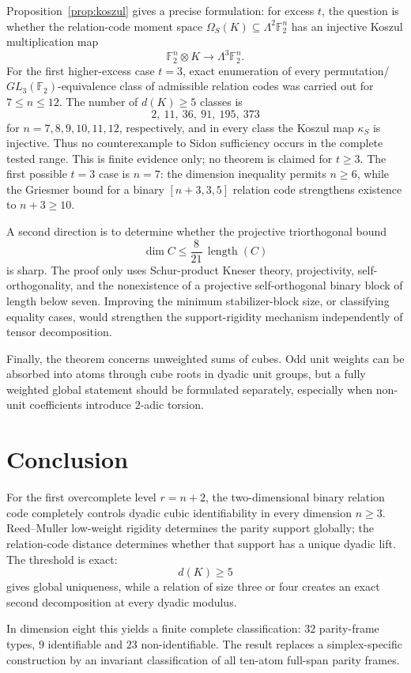 \documentclass[11pt]{article}
\theoremstyle{definition}
\newcommand{\F}{\mathbb F}
\begin{document}
Proposition~\ref{prop:koszul} gives a precise formulation: for excess \(t\), the question is whether the relation-code moment space \(\Omega_S(K)\subseteq\Lambda^2\F_2^n\) has an injective Koszul multiplication map
\[
\F_2^n\otimes K\to\Lambda^3\F_2^n.
\]
For the first higher-excess case \(t=3\), exact enumeration of every permutation/\(GL_3(\F_2)\)-equivalence class of admissible relation codes was carried out for \(7\le n\le12\).  The number of \(d(K)\ge5\) classes is
\[
2,\ 11,\ 36,\ 91,\ 195,\ 373
\]
for \(n=7,8,9,10,11,12\), respectively, and in every class the Koszul map \(\kappa_S\) is injective.  Thus no counterexample to Sidon sufficiency occurs in the complete tested range.  This is finite evidence only; no theorem is claimed for \(t\ge3\).  The first possible \(t=3\) case is \(n=7\): the dimension inequality permits \(n\ge6\), while the Griesmer bound for a binary \([n+3,3,5]\) relation code strengthens existence to \(n+3\ge10\).

A second direction is to determine whether the projective triorthogonal bound
\[
\dim C\le\frac{8}{21}\,\operatorname{length}(C)
\]
is sharp. The proof only uses Schur-product Kneser theory, projectivity, self-orthogonality, and the nonexistence of a projective self-orthogonal binary block of length below seven. Improving the minimum stabilizer-block size, or classifying equality cases, would strengthen the support-rigidity mechanism independently of tensor decomposition.

Finally, the theorem concerns unweighted sums of cubes. Odd unit weights can be absorbed into atoms through cube roots in dyadic unit groups, but a fully weighted global statement should be formulated separately, especially when non-unit coefficients introduce \(2\)-adic torsion.

\section{Conclusion}
For the first overcomplete level \(r=n+2\), the two-dimensional binary relation code completely controls dyadic cubic identifiability in every dimension \(n\ge3\). Reed--Muller low-weight rigidity determines the parity support globally; the relation-code distance determines whether that support has a unique dyadic lift. The threshold is exact:
\[
d(K)\ge5
\]
gives global uniqueness, while a relation of size three or four creates an exact second decomposition at every dyadic modulus.

In dimension eight this yields a finite complete classification: \(32\) parity-frame types, \(9\) identifiable and \(23\) non-identifiable. The result replaces a simplex-specific construction by an invariant classification of all ten-atom full-span parity frames.
\end{document}
